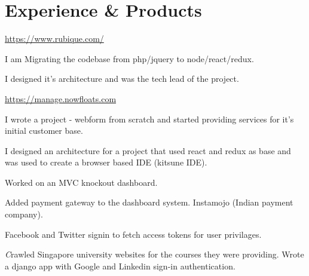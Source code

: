 \documentclass[]{deedy-resume-openfont}
\begin{document}
\hfill
\begin{minipage}[t]{0.66\textwidth}


\section{Experience \& Products}


{ \url{ https://www.rubique.com/ } }\\
\vspace{\topsep} %
\begin{tightemize}
\item I am Migrating the codebase from php/jquery to node/react/redux.
\item I designed it's architecture and was the tech lead of the project.
\end{tightemize}
\sectionsep


{ \url{ https://manage.nowfloats.com } }\\
\begin{tightemize}
\item I wrote a project - webform from scratch and started providing services for it's initial customer base.
\item I designed an architecture for a project that used react and redux as base and was used to create a browser based IDE (kitsune IDE).
\item Worked on an MVC knockout dashboard.
\item Added payment gateway to the dashboard system. Instamojo (Indian payment company).
\item Facebook and Twitter signin to fetch access tokens for user privilages.
\vspace{\topsep} %
\end{tightemize}

\begin{tightemize}
\item \emph Crawled Singapore university websites for the courses they were providing. Wrote a django app with Google and Linkedin sign-in authentication. \end{tightemize}
\sectionsep


\end{minipage}
\end{document}
